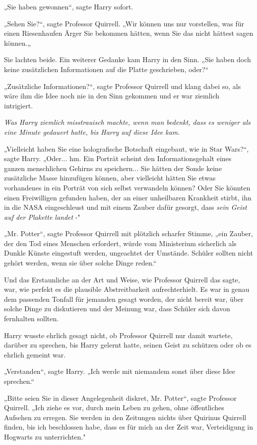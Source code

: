 {„Sie haben gewonnen“, sagte Harry sofort.

„Sehen Sie?“, sagte Professor Quirrell. „Wir können uns nur vorstellen, was für einen Riesenhaufen Ärger Sie bekommen hätten, wenn Sie das nicht hättest sagen können.„

Sie lachten beide. Ein weiterer Gedanke kam Harry in den Sinn. „Sie haben doch keine zusätzlichen Informationen auf die Platte geschrieben, oder?“

„Zusätzliche Informationen?“, sagte Professor Quirrell und klang dabei so, als wäre ihm die Idee noch nie in den Sinn gekommen und er war ziemlich\\ intrigiert.

\emph{Was Harry ziemlich misstrauisch machte, wenn man bedenkt, dass es weniger als eine Minute gedauert hatte, bis Harry auf diese Idee kam.}

„Vielleicht haben Sie eine holografische Botschaft eingebaut, wie in Star Wars?“, sagte Harry. „Oder... hm. Ein Porträt scheint den Informationsgehalt eines ganzen menschlichen Gehirns zu speichern... Sie hätten der Sonde keine zusätzliche Masse hinzufügen können, aber vielleicht hätten Sie etwas vorhandenes in ein Porträt von sich selbst verwandeln können? Oder Sie könnten einen Freiwilligen gefunden haben, der an einer unheilbaren Krankheit stirbt, ihn in die NASA eingeschleust und mit einem Zauber dafür gesorgt, dass \emph{sein Geist auf der Plakette landet} -"

„Mr. Potter“, sagte Professor Quirrell mit plötzlich scharfer Stimme, „ein Zauber, der den Tod eines Menschen erfordert, würde vom Ministerium sicherlich als Dunkle Künste eingestuft werden, ungeachtet der Umstände. Schüler sollten nicht gehört werden, wenn sie über solche Dinge reden.“

Und das Erstaunliche an der Art und Weise, wie Professor Quirrell das sagte, war, wie perfekt es die plausible Abstreitbarkeit aufrechterhielt. Es war in genau dem passenden Tonfall für jemanden gesagt worden, der nicht bereit war, über solche Dinge zu diskutieren und der Meinung war, dass Schüler sich davon fernhalten sollten.

Harry wusste ehrlich gesagt nicht, ob Professor Quirrell nur damit wartete, darüber zu sprechen, bis Harry gelernt hatte, seinen Geist zu schützen oder ob es ehrlich gemeint war.

„Verstanden“, sagte Harry. „Ich werde mit niemandem sonst über diese Idee sprechen.“

„Bitte seien Sie in dieser Angelegenheit diskret, Mr. Potter“, sagte Professor Quirrell. „Ich ziehe es vor, durch mein Leben zu gehen, ohne öffentliches Aufsehen zu erregen. Sie werden in den Zeitungen nichts über Quirinus Quirrell finden, bis ich beschlossen habe, dass es für mich an der Zeit war, Verteidigung in Hogwarts zu unterrichten."

}
